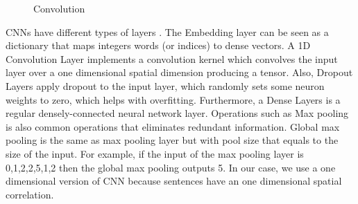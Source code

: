 \documentclass[12pt]{article}
\begin{document}
\begin{figure}[ht!]%
\centering
    \caption{Convolution \cite{cs231}}%
    \label{fig:cnn}%
\end{figure}




CNNs have different types of layers \cite{chollet2015keras}. The Embedding layer can be seen as a dictionary that maps integers words (or indices) to dense vectors. A 1D Convolution Layer implements a convolution kernel which convolves the input layer over a one dimensional spatial dimension producing a tensor. Also, Dropout  Layers apply dropout to the input layer, which randomly sets some neuron weights to zero, which helps with overfitting. Furthermore, a Dense Layers is a regular densely-connected neural network layer. Operations such as Max pooling is also common operations that eliminates redundant information. Global max pooling is the same as max pooling layer but with pool size that equals to the size of the input. For example, if the input of the max pooling layer is 0,1,2,2,5,1,2 then the global max pooling outputs 5. In our case, we use a one dimensional version of CNN because sentences have an one dimensional spatial correlation. 
\end{document}
